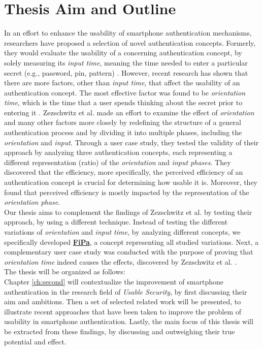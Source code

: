 \section{Thesis Aim and Outline}

In an effort to enhance the usability of smartphone authentication mechanisms, researchers have proposed a selection of novel authentication concepts. Formerly, they would evaluate the usability of a concerning authentication concept, by solely measuring its \textit{input time}, meaning the time needed to enter a particular secret (e.g., password, pin, pattern) \cite{Zezschwitz}.
However, recent research has shown that there are more factors, other than \textit{input time}, that affect the usability of an authentication concept. The most effective factor was found to be \textit{orientation time}, which is the time that a user spends thinking about the secret prior to entering it \cite{Zezschwitz}. Zezschwitz et al. \cite{Zezschwitz} made an effort to examine the effect of \textit{orientation} and many other factors more closely by redefining the structure of a general authentication process and by dividing it into multiple phases, including the \textit{orientation} and \textit{input}. Through a user case study, they tested the validity of their approach by analyzing three authentication concepts, each representing a different representation (ratio) of the \textit{orientation} and \textit{input phases}. They discovered that the efficiency, more specifically, the perceived efficiency of an authentication concept is crucial for determining how usable it is. Moreover, they found that perceived efficiency is mostly impacted by the representation of the \textit{orientation phase}. \\

Our thesis aims to complement the findings of Zezschwitz et al. \cite{Zezschwitz} by testing their approach, by using a different technique. Instead of testing the different variations of \textit{orientation} and \textit{input time}, by analyzing different concepts, we specifically developed \underline{\textbf{FiPa}}, a concept representing all studied variations. Next, a complementary user case study was conducted with the purpose of proving that \textit{orientation time} indeed causes the effects, discovered by Zezschwitz et al. \cite{Zezschwitz}.\\

The thesis will be organized as follows: \\

Chapter \ref{ch:second} will contextualize the improvement of smartphone authentication in the research field of \textit{Usable Security}, by first discussing their aim and ambitions. Then a set of selected related work will be presented, to illustrate recent approaches that have been taken to improve the problem of usability in smartphone authentication. Lastly, the main focus of this thesis will be extracted from these findings, by discussing and outweighing their true potential and effect. \\

